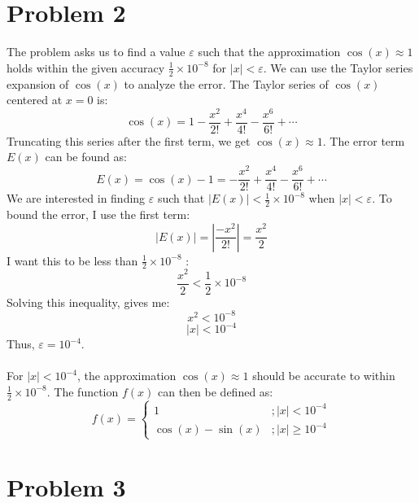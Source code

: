 \documentclass{article}
\begin{document}
\section*{Problem 2}
The problem asks us to find a value $\varepsilon$ such that the approximation $\cos (x) \approx 1$ holds within the given accuracy $\frac{1}{2} \times 10^{-8}$ for $|x|<\varepsilon$. We can use the Taylor series expansion of $\cos (x)$ to analyze the error.
The Taylor series of $\cos (x)$ centered at $x=0$ is:
$$
\cos (x)=1-\frac{x^2}{2 !}+\frac{x^4}{4 !}-\frac{x^6}{6 !}+\cdots
$$
Truncating this series after the first term, we get $\cos (x) \approx 1$.
The error term $E(x)$ can be found as:
$$
E(x)=\cos (x)-1=-\frac{x^2}{2 !}+\frac{x^4}{4 !}-\frac{x^6}{6 !}+\cdots
$$
We are interested in finding $\varepsilon$ such that $|E(x)|<\frac{1}{2} \times 10^{-8}$ when $|x|<\varepsilon$.
To bound the error, I use the first term:
$$
|E(x)|=\left|\frac{-x^2}{2 !}\right|=\frac{x^2}{2}
$$
I want this to be less than $\frac{1}{2} \times 10^{-8}$ :
$$
\frac{x^2}{2}<\frac{1}{2} \times 10^{-8}
$$
Solving this inequality, gives me:
$$
x^2<10^{-8}
$$
$$
|x|<10^{-4}
$$
Thus, $\varepsilon=10^{-4}$.
\\
\\
For $|x|<10^{-4}$, the approximation $\cos (x) \approx 1$ should be accurate to within $\frac{1}{2} \times 10^{-8}$.
The function $f(x)$ can then be defined as:
$$
f(x) = \begin{cases} 
1 & ; |x| < 10^{-4} \\
\cos(x) - \sin(x) & ; |x| \geq 10^{-4}
\end{cases}
$$

\section*{Problem 3}
\end{document}
